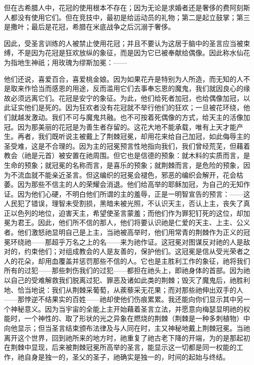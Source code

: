 但在古希腊人中，花冠的使用根本不存在；因为无论是求婚者还是奢侈的费阿刻斯人都没有使用它们。但在竞技中，最初是给运动员的礼物；第二是起立鼓掌；第三是撒叶；最后是花冠，希腊在米底战争之后沉溺于奢侈。\par

因此，受圣言训练的人被禁止使用花冠；并且不要认为这居于脑中的圣言应当被束缚，不是因为花冠是狂欢放纵的象征，而是因为它已被奉献给偶像。因此称水仙花为指地生神祇；用玫瑰为缪斯加冕：——\par

\par

他们还说，喜爱百合，喜爱桃金娘。因为如果花卉是特别为人所造，而无知的人不是取来作恰当而感恩的用途，反而滥用它们去事奉忘恩的魔鬼，我们就因良心的缘故必须远离它们。花冠是安宁的象征。为此，他们给死者加冠，也给偶像加冠，以此证实他们是死的。因为狂欢者没有花冠就不举行他们的狂欢；一旦被花环绕，他们就越发激动。我们不可与魔鬼共融。也不可按着死偶像的方式，给天主的活像加冠。因为那美丽的花冠是为善生者存留的。这花大地不能承载，唯有上天才能产生。再者，我们既听说主被戴上了荆棘冠冕，却用花来给自己加冠，如此侮辱主的圣受难，这是不合理的。因为主的冠冕预言性地指向我们，我们曾经荒芜，但藉着教会（祂是元首）被安置在祂周围。但它也是信德的预象：就木料的实质而言，是生命的预象；就冠冕的名称而言，是喜乐的预象；就荆棘而言，是危险的预象，因为不流血就不能亲近圣言。但这编织的冠冕会褪色，邪恶的编织会解开，花会枯萎。因为那些不信主的人的荣耀会消退。他们给高举的耶稣加冠，为自己的无知作证。因为他们心硬，不明白他们所谓的主的羞辱，正是一明智宣告的预言：——这人民犯了错误，理智未受割损，黑暗未被光照，不认识天主，否认上主，丧失了真正以色列的地位，迫害天主，希望使圣言蒙羞；而他们作为罪犯钉死的这位，却加冕为君王。因此，他们所不信的那人，他们将要认识祂是仁爱的天主、上主、公义者。他们激怒祂显明自己是上主，当祂被高举时，他们用常青的荆棘作为正义的冠冕环绕祂——那超乎万名之上的名——来为祂作证。这冠冕对图谋反对祂的人是敌对的，约束他们；对组成教会的人是友善的，保护他们。这冠冕是信从受光荣者之人的花朵，却用血覆盖并惩罚那些不信的人。它也是主胜利工作的象征，祂将我们所有的过犯——那些刺伤我们的过犯——都担在祂头上，即祂身体的首部。因为祂以自己的受难解救我们脱离过犯、罪恶及诸如此类的荆棘；毁灭了魔鬼后，祂胜利地、恰当地说：我们从荆棘采葡萄，从蒺藜采无花果；而对那些祂伸出双手的人——那悖逆不结果实的百姓——祂却使他们伤痕累累。我还能向你们显示其中另一个神秘意义。因为当宇宙的全能上主开始藉着圣言立法，并愿意向梅瑟显明祂的权能时，一个神性的、取了形状的光之异象在燃烧的荆棘（荆棘是一种多刺植物）中向他显示；但当圣言结束颁布法律及与人同在时，主又神秘地戴上荆棘冠冕。当祂离开这个世界，回到祂所来的地方时，祂重复了祂古老下降的开端，为的是那起初在荆棘中显现，后来被荆棘冠冕所高举的圣言，能显示这一切都是同一权能的工作，祂自身是独一的，圣父的圣子，祂确实是独一的，时间的起始与终结。\par

